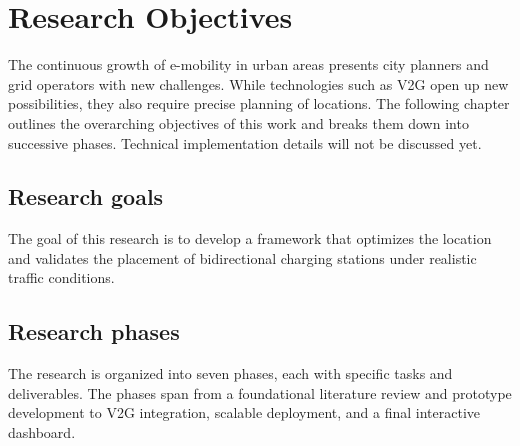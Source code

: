 \section{Research Objectives}
The continuous growth of e-mobility in urban areas presents city planners and grid operators with new challenges. While technologies such as \ac{V2G} open up new possibilities, they also require precise planning of locations.
The following chapter outlines the overarching objectives of this work and breaks them down into successive phases. Technical implementation details will not be discussed yet.

\subsection{Research goals}
The goal of this research is to develop a framework that optimizes the location and validates the placement of bidirectional charging stations under realistic traffic conditions.

\subsection{Research phases}
\label{research_phases}
The research is organized into seven phases, each with specific tasks and deliverables. The phases span from a foundational literature review and prototype development to \ac{V2G} integration, scalable deployment, and a final interactive dashboard.

